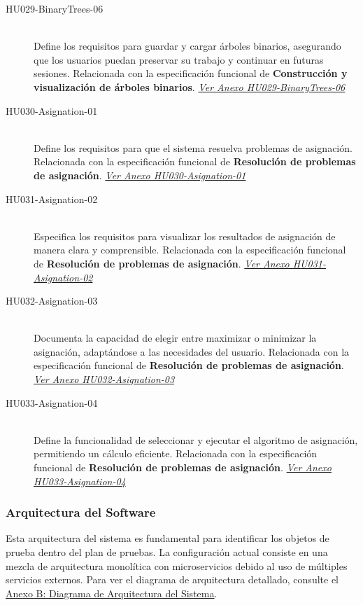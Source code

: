 \documentclass[stu, 12pt, letterpaper, donotrepeattitle, floatsintext, natbib]{apa7}
\begin{document}
\begin{description}
    \item[HU029-BinaryTrees-06] \hfill \\
    Define los requisitos para guardar y cargar árboles binarios, asegurando que los usuarios puedan preservar su trabajo y continuar en futuras sesiones. Relacionada con la especificación funcional de \textbf{Construcción y visualización de árboles binarios}. \textit{\hyperref[tab:HU029-BinaryTrees-06]{Ver Anexo HU029-BinaryTrees-06}}

    \item[HU030-Asignation-01] \hfill \\
    Define los requisitos para que el sistema resuelva problemas de asignación. Relacionada con la especificación funcional de \textbf{Resolución de problemas de asignación}. \textit{\hyperref[tab:HU030-Asignation-01]{Ver Anexo HU030-Asignation-01}}

    \item[HU031-Asignation-02] \hfill \\
    Especifica los requisitos para visualizar los resultados de asignación de manera clara y comprensible. Relacionada con la especificación funcional de \textbf{Resolución de problemas de asignación}. \textit{\hyperref[tab:HU031-Asignation-02]{Ver Anexo HU031-Asignation-02}}

    \item[HU032-Asignation-03] \hfill \\
    Documenta la capacidad de elegir entre maximizar o minimizar la asignación, adaptándose a las necesidades del usuario. Relacionada con la especificación funcional de \textbf{Resolución de problemas de asignación}. \textit{\hyperref[tab:HU032-Asignation-03]{Ver Anexo HU032-Asignation-03}}

    \item[HU033-Asignation-04] \hfill \\
    Define la funcionalidad de seleccionar y ejecutar el algoritmo de asignación, permitiendo un cálculo eficiente. Relacionada con la especificación funcional de \textbf{Resolución de problemas de asignación}. \textit{\hyperref[tab:HU033-Asignation-04]{Ver Anexo HU033-Asignation-04}}

\end{description}

\subsubsection{Arquitectura del Software}
Esta arquitectura del sistema es fundamental para identificar los objetos de prueba dentro del plan de pruebas. La configuración actual consiste en una mezcla de arquitectura monolítica con microservicios debido al uso de múltiples servicios externos. Para ver el diagrama de arquitectura detallado, consulte el \hyperref[fig:architecture]{Anexo B: Diagrama de Arquitectura del Sistema}.
\end{document}
